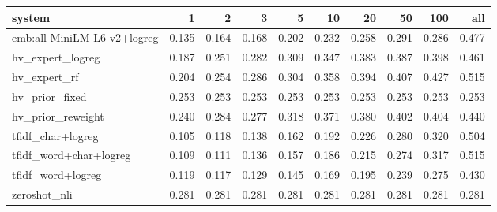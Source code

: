 \begin{tabular}{lrrrrrrrrr}
\toprule
system & 1 & 2 & 3 & 5 & 10 & 20 & 50 & 100 & all \\
\midrule
emb:all-MiniLM-L6-v2+logreg & 0.135 & 0.164 & 0.168 & 0.202 & 0.232 & 0.258 & 0.291 & 0.286 & 0.477 \\
hv\_expert\_logreg & 0.187 & 0.251 & 0.282 & 0.309 & 0.347 & 0.383 & 0.387 & 0.398 & 0.461 \\
hv\_expert\_rf & 0.204 & 0.254 & 0.286 & 0.304 & 0.358 & 0.394 & 0.407 & 0.427 & 0.515 \\
hv\_prior\_fixed & 0.253 & 0.253 & 0.253 & 0.253 & 0.253 & 0.253 & 0.253 & 0.253 & 0.253 \\
hv\_prior\_reweight & 0.240 & 0.284 & 0.277 & 0.318 & 0.371 & 0.380 & 0.402 & 0.404 & 0.440 \\
tfidf\_char+logreg & 0.105 & 0.118 & 0.138 & 0.162 & 0.192 & 0.226 & 0.280 & 0.320 & 0.504 \\
tfidf\_word+char+logreg & 0.109 & 0.111 & 0.136 & 0.157 & 0.186 & 0.215 & 0.274 & 0.317 & 0.515 \\
tfidf\_word+logreg & 0.119 & 0.117 & 0.129 & 0.145 & 0.169 & 0.195 & 0.239 & 0.275 & 0.430 \\
zeroshot\_nli & 0.281 & 0.281 & 0.281 & 0.281 & 0.281 & 0.281 & 0.281 & 0.281 & 0.281 \\
\bottomrule
\end{tabular}
